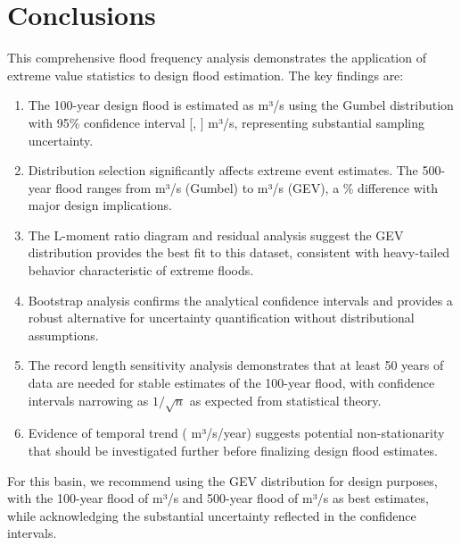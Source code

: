 \documentclass[a4paper, 11pt]{article}
\begin{document}
\section{Conclusions}

This comprehensive flood frequency analysis demonstrates the application of extreme value
statistics to design flood estimation. The key findings are:

\begin{enumerate}
\item The 100-year design flood is estimated as  m³/s using the
Gumbel distribution with 95\% confidence interval [,
] m³/s, representing substantial sampling uncertainty.

\item Distribution selection significantly affects extreme event estimates. The 500-year flood
ranges from  m³/s (Gumbel) to  m³/s (GEV),
a \% difference with major design
implications.

\item The L-moment ratio diagram and residual analysis suggest the GEV distribution provides
the best fit to this dataset, consistent with heavy-tailed behavior characteristic of extreme
floods.

\item Bootstrap analysis confirms the analytical confidence intervals and provides a robust
alternative for uncertainty quantification without distributional assumptions.

\item The record length sensitivity analysis demonstrates that at least 50 years of data are
needed for stable estimates of the 100-year flood, with confidence intervals narrowing as
$1/\sqrt{n}$ as expected from statistical theory.

\item Evidence of temporal trend ( m³/s/year) suggests potential
non-stationarity that should be investigated further before finalizing design flood estimates.
\end{enumerate}

For this basin, we recommend using the GEV distribution for design purposes, with the 100-year
flood of  m³/s and 500-year flood of  m³/s
as best estimates, while acknowledging the substantial uncertainty reflected in the confidence
intervals.
\end{document}
